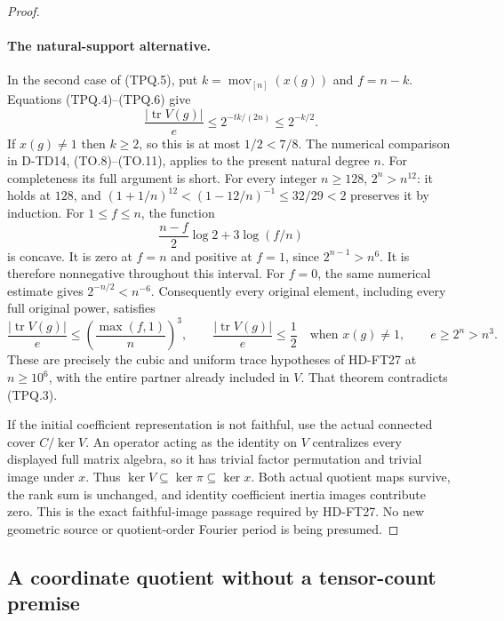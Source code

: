 \begin{proof}
\paragraph{The natural-support alternative.}
In the second case of (TPQ.5), put
$k=\operatorname{mov}_{[n]}(x(g))$ and $f=n-k$.
Equations (TPQ.4)--(TPQ.6) give
\[
 \frac{|\operatorname{tr}V(g)|}{e}
           \le2^{-tk/(2n)}\le2^{-k/2}.
 \tag{TPQ.10}
\]
If $x(g)\ne1$ then $k\ge2$, so this is at most $1/2<7/8$.
The numerical comparison in D-TD14, (TO.8)--(TO.11), applies to
the present natural degree $n$. For completeness its full argument
is short. For every integer $n\ge128$, $2^n>n^{12}$: it holds
at $128$, and $(1+1/n)^{12}<(1-12/n)^{-1}\le32/29<2$
preserves it by induction. For $1\le f\le n$, the function
\[
       \frac{n-f}{2}\log2+3\log(f/n)
 \tag{TPQ.11}
\]
is concave. It is zero at $f=n$ and positive at $f=1$, since
$2^{n-1}>n^6$. It is therefore nonnegative throughout this
interval. For $f=0$, the same numerical estimate gives
$2^{-n/2}<n^{-6}$. Consequently every original element, including
every full original power, satisfies
\[
 \frac{|\operatorname{tr}V(g)|}{e}
       \le\left(\frac{\max(f,1)}{n}\right)^3,
 \qquad
 \frac{|\operatorname{tr}V(g)|}{e}\le\frac12
          \quad\text{when }x(g)\ne1,
 \qquad e\ge2^n>n^3.
 \tag{TPQ.12}
\]
These are precisely the cubic and uniform trace hypotheses of
HD-FT27 at $n\ge10^6$, with the entire partner already included
in $V$. That theorem contradicts (TPQ.3).

If the initial coefficient representation is not faithful, use
the actual connected cover $C/\ker V$. An operator acting as the
identity on $V$ centralizes every displayed full matrix algebra,
so it has trivial factor permutation and trivial image under $x$.
Thus $\ker V\subseteq\ker\pi\subseteq\ker x$. Both actual
quotient maps survive, the rank sum is unchanged, and identity
coefficient inertia images contribute zero. This is the exact
faithful-image passage required by HD-FT27. No new geometric
source or quotient-order Fourier period is being presumed.
\end{proof}

\subsection*{A coordinate quotient without a tensor-count premise}

